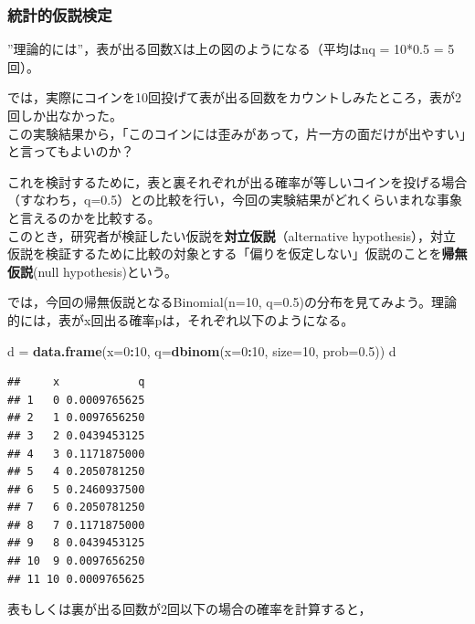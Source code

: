 \documentclass[]{article}
\newenvironment{Shaded}{\begin{snugshade}}{\end{snugshade}}
\newcommand{\KeywordTok}[1]{\textcolor[rgb]{0.13,0.29,0.53}{\textbf{#1}}}
\newcommand{\DataTypeTok}[1]{\textcolor[rgb]{0.13,0.29,0.53}{#1}}
\newcommand{\DecValTok}[1]{\textcolor[rgb]{0.00,0.00,0.81}{#1}}
\newcommand{\FloatTok}[1]{\textcolor[rgb]{0.00,0.00,0.81}{#1}}
\newcommand{\StringTok}[1]{\textcolor[rgb]{0.31,0.60,0.02}{#1}}
\newcommand{\OperatorTok}[1]{\textcolor[rgb]{0.81,0.36,0.00}{\textbf{#1}}}
\newcommand{\NormalTok}[1]{#1}
\begin{document}
\subsubsection{統計的仮説検定}

''理論的には''，表が出る回数Xは上の図のようになる（平均はnq = 10*0.5 =
5回）。

では，実際にコインを10回投げて表が出る回数をカウントしみたところ，表が2回しか出なかった。\\
この実験結果から，「このコインには歪みがあって，片一方の面だけが出やすい」と言ってもよいのか？

これを検討するために，表と裏それぞれが出る確率が等しいコインを投げる場合（すなわち，q=0.5）との比較を行い，今回の実験結果がどれくらいまれな事象と言えるのかを比較する。\\
このとき，研究者が検証したい仮説を\textbf{対立仮説}（alternative
hypothesis），対立仮説を検証するために比較の対象とする「偏りを仮定しない」仮説のことを\textbf{帰無仮説}(null
hypothesis)という。

では，今回の帰無仮説となるBinomial(n=10,
q=0.5)の分布を見てみよう。理論的には，表がx回出る確率pは，それぞれ以下のようになる。

\begin{Shaded}
\begin{Highlighting}[]
\NormalTok{d =}\StringTok{ }\KeywordTok{data.frame}\NormalTok{(}\DataTypeTok{x=}\DecValTok{0}\OperatorTok{:}\DecValTok{10}\NormalTok{, }\DataTypeTok{q=}\KeywordTok{dbinom}\NormalTok{(}\DataTypeTok{x=}\DecValTok{0}\OperatorTok{:}\DecValTok{10}\NormalTok{, }\DataTypeTok{size=}\DecValTok{10}\NormalTok{, }\DataTypeTok{prob=}\FloatTok{0.5}\NormalTok{))}
\NormalTok{d}
\end{Highlighting}
\end{Shaded}

\begin{verbatim}
##     x            q
## 1   0 0.0009765625
## 2   1 0.0097656250
## 3   2 0.0439453125
## 4   3 0.1171875000
## 5   4 0.2050781250
## 6   5 0.2460937500
## 7   6 0.2050781250
## 8   7 0.1171875000
## 9   8 0.0439453125
## 10  9 0.0097656250
## 11 10 0.0009765625
\end{verbatim}

表もしくは裏が出る回数が2回以下の場合の確率を計算すると，

\begin{Shaded}
\end{Shaded}
\end{document}
